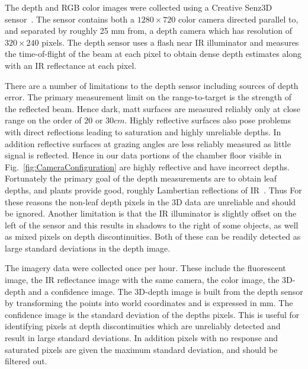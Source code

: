 The depth and RGB color images were collected using a Creative Senz3D sensor~\cite{nguyen2015vietnamese}. The sensor contains both a $1280 \times 720$ color camera directed parallel to, and separated by roughly 25 mm from, a depth camera which has resolution of $320\times240$ pixels. The depth sensor uses a flash near IR illuminator and measures the time-of-flight of the beam at each pixel to obtain dense depth estimates along with an IR reflectance at each pixel.

There are a number of limitations to the depth sensor including sources of depth error. The primary measurement limit on the range-to-target is the strength of the reflected beam. Hence dark, matt surfaces are measured reliably only at close range on the order of $20$ or $30cm$.  Highly reflective surfaces also pose problems with direct reflections leading to saturation and highly unreliable depths.  In addition reflective surfaces at grazing angles are less reliably measured as little signal is reflected.  Hence in our data portions of the chamber floor visible in Fig.~\ref{fig:CameraConfiguration} are highly reflective and have incorrect depths.  Fortunately the primary goal of the depth measurements are to obtain leaf depths, and plants provide good, roughly Lambertian reflections of IR~\cite{Chelle2006219}.  Thus For these reasons the non-leaf depth pixels in the 3D data are unreliable and should be ignored.  Another limitation is that the IR illuminator is slightly offset on the left of the sensor and this results in shadows to the right of some objects, as well as mixed pixels on depth discontinuities.  Both of these can be readily detected as large standard deviations in the depth image.

The imagery data were collected once per hour. %
These include the fluorescent image, the IR reflectance image with the same camera, the color image, the 3D-depth and a confidence image.  The 3D-depth image is built from the depth sensor by transforming the points into world coordinates and is expressed in mm.  The confidence image is the standard deviation of the depths pixels.  This is useful for identifying pixels at depth discontinuities which are unreliably detected and result in large standard deviations.  In addition pixels with no response and saturated pixels are given the maximum standard deviation, and should be filtered out.
